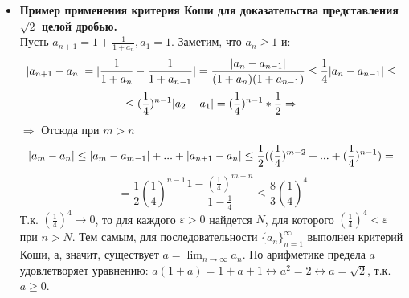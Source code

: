 \documentclass[12pt,a4paper]{article}
\begin{document}
\begin{itemize}
\item \textbf{Пример применения критерия Коши для доказательства представления $\sqrt2$ целой дробью.} \\
Пусть $a_{n+1} = 1 + \frac{1}{1+a_n}, a_1 = 1$. Заметим, что $a_n \geq 1$ и:
\[
|a_{n+1} - a_n| = |\frac{1}{1 + a_n} - \frac{1}{1 + a_{n-1}}| = \frac{|a_n - a_{n-1}|}{(1+a_n)(1+a_{n-1})} \leq \frac{1}{4} |a_n - a_{n-1}| \leq \\
\]
\[
\leq (\frac{1}{4})^{n-1} |a_2 - a_1| = (\frac{1}{4})^{n-1}*\frac{1}{2} \Rightarrow \\
\]
$\Rightarrow$ Отсюда при $m > n$ \\
\[
|a_m - a_n| \leq |a_m - a_{m-1}| + ... + |a_{n+1} - a_n| \leq \frac{1}{2} ((\frac{1}{4})^{m-2} + ... + (\frac{1}{4})^{n-1}) = \\
\]
\[
= \frac{1}{2}(\frac{1}{4})^{n-1} \frac{1 - (\frac{1}{4})^{m - n}}{1 - \frac{1}{4}} \leq \frac{8}{3}(\frac{1}{4})^4
\]
Т.к. $(\frac{1}{4})^4 \longrightarrow 0$, то для каждого $\varepsilon > 0$ найдется $N$, для которого $(\frac{1}{4})^4 < \varepsilon$ при $n > N$. Тем самым, для последовательности $\{a_n\}_{n=1}^{\infty}$ выполнен критерий Коши, а, значит, существует $a = \lim_{n \to \infty}{a_n}$. По арифметике предела $a$ удовлетворяет уравнению: $a(1+a) = 1 + a +1 \leftrightarrow a^2 = 2 \leftrightarrow a = \sqrt2$, т.к. $a \geq 0$.
\end{itemize}
\end{document}
